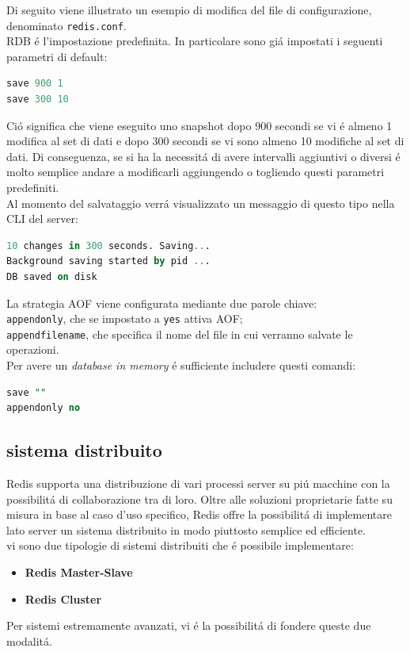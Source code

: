 Di seguito viene illustrato un esempio di modifica del file di configurazione, denominato \texttt{redis.conf}.\\

RDB é l'impostazione predefinita. In particolare sono giá impostati i seguenti parametri di default:
\begin{lstlisting}[autogobble, style=redis-cli, language=SQL]
save 900 1
save 300 10\end{lstlisting}
Ció significa che viene eseguito uno snapshot dopo 900 secondi se vi é almeno 1 modifica al set di dati e dopo
300 secondi se vi sono almeno 10 modifiche al set di dati.
Di conseguenza, se si ha la necessitá di avere intervalli aggiuntivi o diversi é molto semplice andare a modificarli aggiungendo o togliendo questi parametri predefiniti.\\

Al momento del salvataggio verrá visualizzato un messaggio di questo tipo nella CLI del server:
\begin{lstlisting}[autogobble, style=redis-cli, language=SQL]
10 changes in 300 seconds. Saving...
Background saving started by pid ...
DB saved on disk\end{lstlisting}


La strategia AOF viene configurata mediante due parole chiave:\\
\texttt{appendonly}, che se impostato a \texttt{yes} attiva AOF;\\
\texttt{appendfilename}, che specifica il nome del file in cui verranno salvate le operazioni.\\

Per avere un \emph{database in memory} é sufficiente includere questi comandi:
\begin{lstlisting}[autogobble, style=redis-cli, language=SQL]
save ""
appendonly no\end{lstlisting}



\subsection{sistema distribuito}
Redis supporta una distribuzione di vari processi server su piú macchine con la possibilitá di collaborazione tra di loro.
Oltre alle soluzioni proprietarie fatte su misura in base al caso d'uso specifico, Redis offre la possibilitá di implementare lato server un
sistema distribuito in modo piuttosto semplice ed efficiente.\\
vi sono due tipologie di sistemi distribuiti che é possibile implementare:
\begin{itemize}
    \item \textbf{Redis Master-Slave}
    \item \textbf{Redis Cluster}
\end{itemize}
Per sistemi estremamente avanzati, vi é la possibilitá di fondere queste due modalitá.

